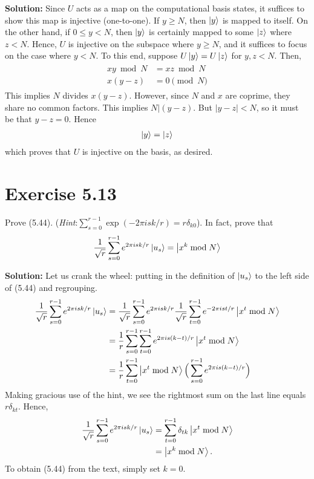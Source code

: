 \documentclass{book}
\begin{document}
    \textbf{Solution:} Since $U$ acts as a map on the computational basis states, it suffices to show this map is injective (one-to-one). If $y\geq N$, then $\ket{y}$ is mapped to itself. On the other hand, if $0\leq y < N$, then $\ket{y}$ is certainly mapped to some $\ket{z}$ where $z< N$. Hence, $U$ is injective on the subspace where $y\geq N$, and it suffices to focus on the case where $y< N$. To this end, suppose $U\ket{y} = U\ket{z}$ for $y,z < N$. Then,
    \begin{align}
    \begin{aligned}
        xy\bmod{N} &= xz\bmod{N} \\
        x(y-z) &= 0 \pmod{N}
    \end{aligned}
    \end{align}
    This implies $N$ divides $x(y-z)$. However, since $N$ and $x$ are coprime, they share no common factors. This implies $N|(y-z)$. But $|y-z| < N$, so it must be that $y-z = 0$. Hence
    \begin{align}
        \ket{y} = \ket{z}
    \end{align}
    which proves that $U$ is injective on the basis, as desired.

\section*{Exercise 5.13}
    Prove (5.44). (\emph{Hint}:$\sum_{s=0}^{r-1}\exp(-2\pi i sk/r)=r\delta_{k0}$). In fact, prove that
    \begin{align}
        \frac{1}{\sqrt{r}}\sum_{s=0}^{r-1}e^{2\pi isk/r}\ket{u_s} = \ket{x^k\bmod N}
    \end{align}

    \textbf{Solution:} Let us crank the wheel: putting in the definition of $\ket{u_s}$ to the left side of (5.44) and regrouping.
    \begin{align}
        \frac{1}{\sqrt{r}}\sum_{s=0}^{r-1}e^{2\pi isk/r}\ket{u_s} &= \frac{1}{\sqrt{r}}\sum_{s=0}^{r-1}e^{2\pi isk/r} \frac{1}{\sqrt{r}}\sum_{t=0}^{r-1}e^{-2\pi ist/r}\ket{x^t\bmod N} \\
        &= \frac{1}{r}\sum_{s=0}^{r-1}\sum_{t=0}^{r-1}e^{2\pi is(k-t)/r}\ket{x^t\bmod N} \\
        &=\frac{1}{r}\sum_{t=0}^{r-1}\ket{x^t\bmod N}\Big(\sum_{s=0}^{r-1}e^{2\pi is(k-t)/r}\Big)
    \end{align}
    Making gracious use of the hint, we see the rightmost sum on the last line equals $r\delta_{kt}$. Hence,
    \begin{align}
        \frac{1}{\sqrt{r}}\sum_{s=0}^{r-1}e^{2\pi isk/r}\ket{u_s} &= \sum_{t=0}^{r-1}\delta_{tk}\ket{x^t \bmod N} \\
        &= \ket{x^k \bmod N}.
    \end{align}
    To obtain (5.44) from the text, simply set $k=0$.
\end{document}
